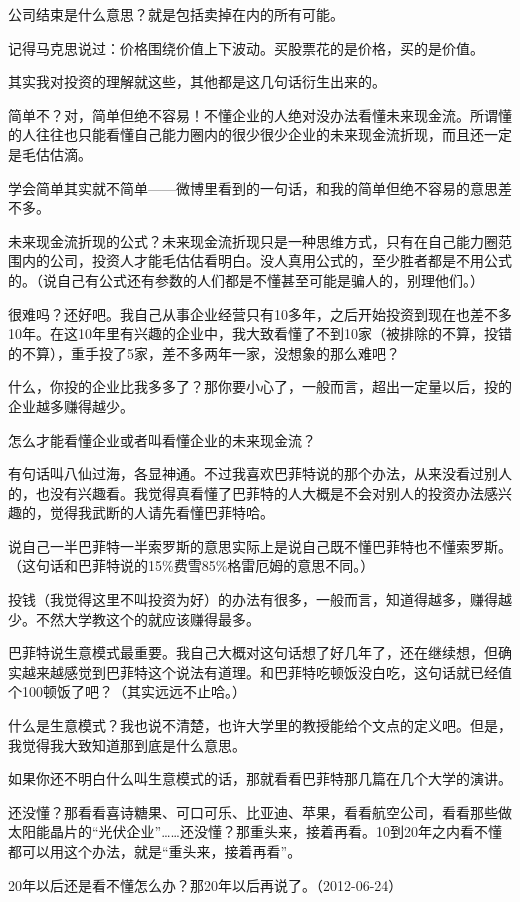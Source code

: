 公司结束是什么意思？就是包括卖掉在内的所有可能。

记得马克思说过：价格围绕价值上下波动。买股票花的是价格，买的是价值。

其实我对投资的理解就这些，其他都是这几句话衍生出来的。

简单不？对，简单但绝不容易！不懂企业的人绝对没办法看懂未来现金流。所谓懂的人往往也只能看懂自己能力圈内的很少很少企业的未来现金流折现，而且还一定是毛估估滴。

学会简单其实就不简单——微博里看到的一句话，和我的简单但绝不容易的意思差不多。

未来现金流折现的公式？未来现金流折现只是一种思维方式，只有在自己能力圈范围内的公司，投资人才能毛估估看明白。没人真用公式的，至少胜者都是不用公式的。（说自己有公式还有参数的人们都是不懂甚至可能是骗人的，别理他们。）

很难吗？还好吧。我自己从事企业经营只有10多年，之后开始投资到现在也差不多10年。在这10年里有兴趣的企业中，我大致看懂了不到10家（被排除的不算，投错的不算），重手投了5家，差不多两年一家，没想象的那么难吧？

什么，你投的企业比我多多了？那你要小心了，一般而言，超出一定量以后，投的企业越多赚得越少。

怎么才能看懂企业或者叫看懂企业的未来现金流？

有句话叫八仙过海，各显神通。不过我喜欢巴菲特说的那个办法，从来没看过别人的，也没有兴趣看。我觉得真看懂了巴菲特的人大概是不会对别人的投资办法感兴趣的，觉得我武断的人请先看懂巴菲特哈。

说自己一半巴菲特一半索罗斯的意思实际上是说自己既不懂巴菲特也不懂索罗斯。（这句话和巴菲特说的15\%费雪85\%格雷厄姆的意思不同。）

投钱（我觉得这里不叫投资为好）的办法有很多，一般而言，知道得越多，赚得越少。不然大学教这个的就应该赚得最多。

巴菲特说生意模式最重要。我自己大概对这句话想了好几年了，还在继续想，但确实越来越感觉到巴菲特这个说法有道理。和巴菲特吃顿饭没白吃，这句话就已经值个100顿饭了吧？（其实远远不止哈。）

什么是生意模式？我也说不清楚，也许大学里的教授能给个文点的定义吧。但是，我觉得我大致知道那到底是什么意思。

如果你还不明白什么叫生意模式的话，那就看看巴菲特那几篇在几个大学的演讲。

还没懂？那看看喜诗糖果、可口可乐、比亚迪、苹果，看看航空公司，看看那些做太阳能晶片的“光伏企业”……还没懂？那重头来，接着再看。10到20年之内看不懂都可以用这个办法，就是“重头来，接着再看”。

20年以后还是看不懂怎么办？那20年以后再说了。（2012-06-24）

